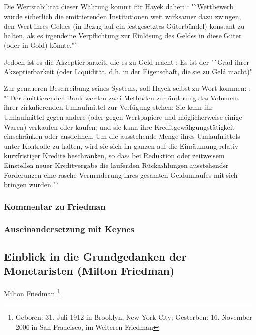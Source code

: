 \documentclass[
        onecolumn,
        a4paper,
        abstracton,
        parskip=half
        ,final
        ]{scrartcl}
\begin{document}
Die Wertstabilit{\"a}t dieser W{\"a}hrung kommt f{\"u}r Hayek daher: \citep[vgl.][S.32]{Hayek1977}: "`Wettbewerb w{\"u}rde sicherlich die emittierenden Institutionen weit wirksamer dazu zwingen, den Wert ihres Geldes (in Bezug auf ein festgesetztes G{\"u}terb{\"u}ndel) konstant zu halten, als es irgendeine Verpflichtung zur Einl{\"o}sung des Geldes in diese G{\"u}ter (oder in Gold) k{\"o}nnte."`

Jedoch ist es die Akzeptierbarkeit, die es zu Geld macht \citep[vgl.][S.40]{Hayek1977}: Es ist der "`Grad ihrer Akzeptierbarkeit (oder Liquidit{\"a}t, d.h. in der Eigenschaft, die sie zu Geld macht)"

Zur genaueren Beschreibung seines Systems, soll Hayek selbst zu Wort kommen: \citep[vgl.][S.45]{Hayek1977}: "`Der emittierenden Bank werden zwei Methoden zur {\"a}nderung des Volumens ihrer zirkulierenden Umlaufmittel zur Verf{\"u}gung stehen: Sie kann ihr Umlaufmittel gegen andere (oder gegen Wertpapiere und m{\"o}glicherweise einige Waren) verkaufen oder kaufen; und sie kann ihre Kreditgew{\"a}hgungst{\"a}tigkeit einschr{\"a}nken oder ausdehnen. Um die ausstehende Menge ihres Umlaufmittels unter Kontrolle zu halten, wird sie sich im ganzen auf die Einr{\"a}umung relativ kurzfristiger Kredite beschr{\"a}nken, so dass bei Reduktion oder zeitweisem Einstellen neuer Kreditvergabe die laufenden R{\"u}ckzahlungen ausstehender Forderungen eine rasche Verminderung ihres gesamten Geldumlaufes mit sich bringen w{\"u}rden."`

\subsubsection{Kommentar zu Friedman}

\subsubsection{Auseinandersetzung mit Keynes}

















\subsection{Einblick in die Grundgedanken der Monetaristen (Milton Friedman)}
Milton Friedman \footnote[16]{Geboren: 31. Juli 1912 in Brooklyn, New York City; Gestorben: 16. November 2006 in San Francisco, im Weiteren Friedman}
\end{document}
